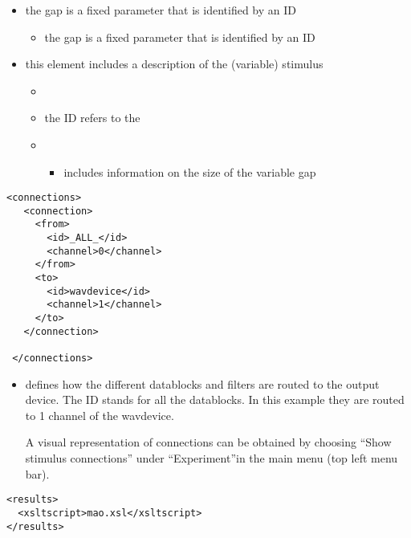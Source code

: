 \begin{itemize}

\item {} the gap is a fixed parameter that
is identified by an ID

\begin{itemize}
\item {} the gap is a fixed parameter that is
identified by an ID
\end{itemize}

\item {} this element includes a description of
the (variable) stimulus

\begin{itemize}
\item {}

\item {} the ID refers to the

\item {}
\begin{itemize}
\item {} includes information on the size of the
variable gap
\end{itemize}

\end{itemize}
\end{itemize}








\begin{lstlisting}
<connections>
   <connection>
     <from>
       <id>_ALL_</id>
       <channel>0</channel>
     </from>
     <to>
       <id>wavdevice</id>
       <channel>1</channel>
     </to>
   </connection>

 </connections>
\end{lstlisting}

 

\begin{itemize}

\item {} defines how the different datablocks
and filters are routed to the output device. The ID 
stands for all the datablocks. In this example they are routed to
1 channel of the wavdevice.

A visual representation of connections can be obtained by choosing
``Show stimulus connections'' under ``Experiment''in the main
\apex menu (top left menu bar).

\end{itemize}
\begin{lstlisting}
<results>
  <xsltscript>mao.xsl</xsltscript>
</results>
\end{lstlisting}

